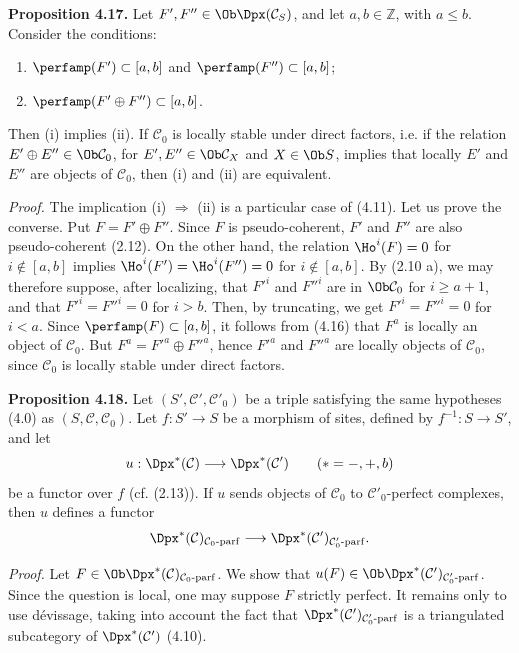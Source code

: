 \textbf{Proposition 4.17.} Let \(F',F''\in\Ob\Dpx(\mathcal C_S)\), and let \(a,b\in\mathbb Z\), with \(a\leq b\). Consider the conditions:
\begin{enumerate}[label=(\roman*)]
\item \(\perfamp(F')\subset[a,b]\) and \(\perfamp(F'')\subset[a,b]\);
\item \(\perfamp(F'\oplus F'')\subset[a,b]\).
\end{enumerate}
Then (i) implies (ii). If \(\mathcal C_0\) is locally stable under direct factors, i.e. if the relation \(E'\oplus E''\in\Ob\mathcal C_0\), for \(E',E''\in\Ob\mathcal C_X\) and \(X\in\Ob S\), implies that locally \(E'\) and \(E''\) are objects of \(\mathcal C_0\), then (i) and (ii) are equivalent.

\emph{Proof.} The implication (i) \(\Rightarrow\) (ii) is a particular case of (4.11). Let us prove the converse. Put \(F=F'\oplus F''\). Since \(F\) is pseudo-coherent, \(F'\) and \(F''\) are also pseudo-coherent (2.12). On the other hand, the relation \(\Ho^i(F)=0\) for \(i\notin[a,b]\) implies \(\Ho^i(F')=\Ho^i(F'')=0\) for \(i\notin[a,b]\). By (2.10 a), we may therefore suppose, after localizing, that \(F'^i\) and \(F''^i\) are in \(\Ob\mathcal C_0\) for \(i\geq a+1\), and that \(F'^i=F''^i=0\) for \(i>b\). Then, by truncating, we get \(F'^i=F''^i=0\) for \(i<a\). Since \(\perfamp(F)\subset[a,b]\), it follows from (4.16) that \(F^a\) is locally an object of \(\mathcal C_0\). But \(F^a=F'^a\oplus F''^a\), hence \(F'^a\) and \(F''^a\) are locally objects of \(\mathcal C_0\), since \(\mathcal C_0\) is locally stable under direct factors.

\textbf{Proposition 4.18.} Let \((S',\mathcal C',\mathcal C'_0)\) be a triple satisfying the same hypotheses (4.0) as \((S,\mathcal C,\mathcal C_0)\). Let \(f:S'\to S\) be a morphism of sites, defined by \(f^{-1}:S\to S'\), and let
\[
  u:\Dpx^*(\mathcal C)\longrightarrow \Dpx^*(\mathcal C')\qquad (*=-,+,b)
\]
be a functor over \(f\) (cf. (2.13)). If \(u\) sends objects of \(\mathcal C_0\) to \(\mathcal C'_0\)-perfect complexes, then \(u\) defines a functor
\[
  \Dpx^*(\mathcal C)_{\mathcal C_0\text{-}\mathrm{parf}}
  \longrightarrow
  \Dpx^*(\mathcal C')_{\mathcal C'_0\text{-}\mathrm{parf}}.
\]

\emph{Proof.} Let \(F\in\Ob\Dpx^*(\mathcal C)_{\mathcal C_0\text{-}\mathrm{parf}}\). We show that \(u(F)\in\Ob\Dpx^*(\mathcal C')_{\mathcal C'_0\text{-}\mathrm{parf}}\). Since the question is local, one may suppose \(F\) strictly perfect. It remains only to use dévissage, taking into account the fact that \(\Dpx^*(\mathcal C')_{\mathcal C'_0\text{-}\mathrm{parf}}\) is a triangulated subcategory of \(\Dpx^*(\mathcal C')\) (4.10).

